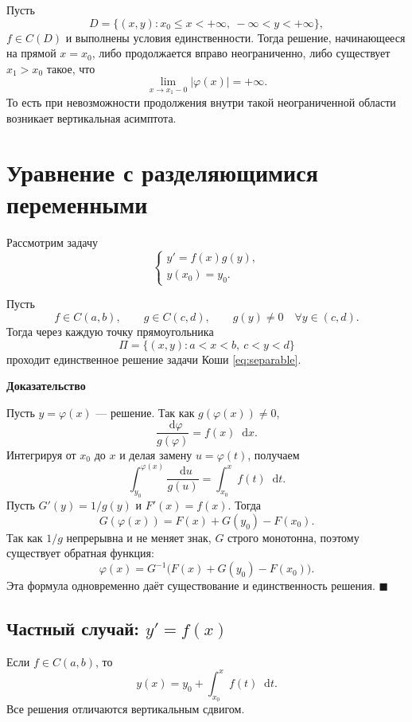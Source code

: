 \documentclass[12pt,a4paper]{article}
\numberwithin{equation}{section}
\newcommand{\dd}{\mathop{}\!\mathrm{d}}
\renewenvironment{proof}[1][Доказательство]{\begin{center}\textbf{#1}\end{center}}{\hfill$\blacksquare$\par}
\DeclareRobustCommand{\examtag}[1]{\space{\normalfont\small\color{HSEgray}(#1)}}
\begin{document}
\begin{theoremHSE}
Пусть
\[
D=\{(x,y):x_0\le x<+\infty,\ -\infty<y<+\infty\},
\]
$f\in C(D)$ и выполнены условия единственности. Тогда решение, начинающееся на прямой $x=x_0$, либо продолжается вправо неограниченно, либо существует $x_1>x_0$ такое, что
\[
\lim_{x\to x_1-0}|\varphi(x)|=+\infty.
\]
То есть при невозможности продолжения внутри такой неограниченной области возникает вертикальная асимптота.
\end{theoremHSE}

\section[Уравнения с разделяющимися переменными\examtag{вопрос~9}]{Уравнение с разделяющимися переменными\examtag{вопрос~9}}

Рассмотрим задачу
\begin{equation}
\begin{cases}
 y'=f(x)g(y),\\
 y(x_0)=y_0.
\end{cases}
\label{eq:separable}
\end{equation}

\begin{theoremHSE}
Пусть
\[
f\in C(a,b),\qquad g\in C(c,d),\qquad g(y)\neq0\quad \forall y\in(c,d).
\]
Тогда через каждую точку прямоугольника
\[
\Pi=\{(x,y):a<x<b,\ c<y<d\}
\]
проходит единственное решение задачи Коши \eqref{eq:separable}.
\end{theoremHSE}

\begin{proof}
Пусть $y=\varphi(x)$ --- решение. Так как $g(\varphi(x))\neq0$,
\[
\frac{\dd\varphi}{g(\varphi)}=f(x)\dd x.
\]
Интегрируя от $x_0$ до $x$ и делая замену $u=\varphi(t)$, получаем
\[
\int_{y_0}^{\varphi(x)}\frac{\dd u}{g(u)}
=
\int_{x_0}^{x}f(t)\dd t.
\]
Пусть $G'(y)=1/g(y)$ и $F'(x)=f(x)$. Тогда
\[
G(\varphi(x))=F(x)+G(y_0)-F(x_0).
\]
Так как $1/g$ непрерывна и не меняет знак, $G$ строго монотонна, поэтому существует обратная функция:
\[
\varphi(x)=G^{-1}\bigl(F(x)+G(y_0)-F(x_0)\bigr).
\]
Эта формула одновременно даёт существование и единственность решения.
\end{proof}

\subsection{Частный случай: \texorpdfstring{$y'=f(x)$}{y'=f(x)}}
Если $f\in C(a,b)$, то
\[
y(x)=y_0+\int_{x_0}^{x}f(t)\dd t.
\]
Все решения отличаются вертикальным сдвигом.
\end{document}
